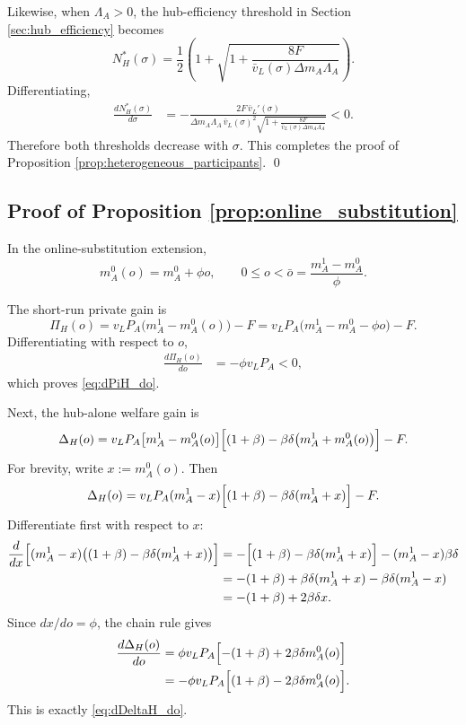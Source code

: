 Likewise, when $\Lambda_A>0$, the hub-efficiency threshold in Section \ref{sec:hub_efficiency} becomes
\begin{equation}
N_H^*(\sigma)
=
\frac{1}{2}
\left(
1+\sqrt{1+\frac{8F}{\bar v_L(\sigma)\Delta m_A\Lambda_A}}
\right).
\label{eq:app7_NH_sigma}
\end{equation}
Differentiating,
\begin{align}
\frac{dN_H^*(\sigma)}{d\sigma}
&=
-\frac{2F\,\bar v_L'(\sigma)}
{\Delta m_A\Lambda_A\,\bar v_L(\sigma)^2
\sqrt{1+\frac{8F}{\bar v_L(\sigma)\Delta m_A\Lambda_A}}}
<0.
\label{eq:app7_dNH_dsigma}
\end{align}
Therefore both thresholds decrease with $\sigma$. This completes the proof of Proposition \ref{prop:heterogeneous_participants}.
\qed

\subsection{Proof of Proposition \ref{prop:online_substitution}}

In the online-substitution extension,
\[
m_A^0(o)=m_A^0+\phi o,
\qquad
0\le o<\bar o=\frac{m_A^1-m_A^0}{\phi}.
\]

The short-run private gain is
\[
\Pi_H(o)
=
v_LP_A\bigl(m_A^1-m_A^0(o)\bigr)-F
=
v_LP_A\bigl(m_A^1-m_A^0-\phi o\bigr)-F.
\]
Differentiating with respect to $o$,
\begin{align}
\frac{d\Pi_H(o)}{do}
&=
-\phi v_LP_A<0,
\label{eq:app7_dPiH_do_raw}
\end{align}
which proves \eqref{eq:dPiH_do}.

Next, the hub-alone welfare gain is
\[
\Delta_H(o)
=
v_LP_A\bigl[m_A^1-m_A^0(o)\bigr]
\Bigl[(1+\beta)-\beta\delta\bigl(m_A^1+m_A^0(o)\bigr)\Bigr]-F.
\]
For brevity, write $x:=m_A^0(o)$. Then
\[
\Delta_H(o)=v_LP_A(m_A^1-x)\Bigl[(1+\beta)-\beta\delta(m_A^1+x)\Bigr]-F.
\]
Differentiate first with respect to $x$:
\begin{align}
\frac{d}{dx}\Bigl[(m_A^1-x)\bigl((1+\beta)-\beta\delta(m_A^1+x)\bigr)\Bigr]
&=
-\Bigl[(1+\beta)-\beta\delta(m_A^1+x)\Bigr]
-(m_A^1-x)\beta\delta
\nonumber\\
&=
-(1+\beta)+\beta\delta(m_A^1+x)-\beta\delta(m_A^1-x)
\nonumber\\
&=
-(1+\beta)+2\beta\delta x.
\label{eq:app7_chain_x}
\end{align}
Since $dx/do=\phi$, the chain rule gives
\begin{align}
\frac{d\Delta_H(o)}{do}
&=
\phi v_LP_A\Bigl[-(1+\beta)+2\beta\delta m_A^0(o)\Bigr]
\nonumber\\
&=
-\phi v_LP_A\Bigl[(1+\beta)-2\beta\delta m_A^0(o)\Bigr].
\label{eq:app7_dDeltaH_do_raw}
\end{align}
This is exactly \eqref{eq:dDeltaH_do}.

